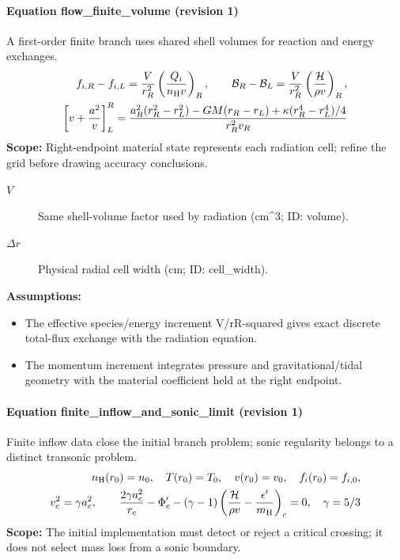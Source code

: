 \paragraph{Equation flow\_finite\_volume (revision 1)}
A first-order finite branch uses shared shell volumes for reaction and energy exchanges.
\begin{equation}
\begin{aligned}
f_{i,R}-f_{i,L}=\frac{V}{r_R^2}\left(\frac{Q_i}{n_{\rm H}v}\right)_R,\qquad \mathcal B_R-\mathcal B_L=\frac{V}{r_R^2}\left(\frac{\mathcal H}{\rho v}\right)_R,\\\left[v+\frac{a^2}{v}\right]_L^R=\frac{a_R^2(r_R^2-r_L^2)-GM(r_R-r_L)+\kappa(r_R^4-r_L^4)/4}{r_R^2v_R}
\end{aligned}
\label{eq:escape.coupled_5f_hydrogen:flow_5f_finite_5f_volume:1}
\end{equation}
\noindent\textbf{Scope:} Right-endpoint material state represents each radiation cell; refine the grid before drawing accuracy conclusions.

\begin{description}
\item[$V$] Same shell-volume factor used by radiation (cm\textasciicircum{}3; ID: volume).
\item[$\Delta r$] Physical radial cell width (cm; ID: cell\_width).
\end{description}

\noindent\textbf{Assumptions:}
\begin{itemize}
\item The effective species/energy increment V/rR-squared gives exact discrete total-flux exchange with the radiation equation.
\item The momentum increment integrates pressure and gravitational/tidal geometry with the material coefficient held at the right endpoint.
\end{itemize}

\paragraph{Equation finite\_inflow\_and\_sonic\_limit (revision 1)}
Finite inflow data close the initial branch problem; sonic regularity belongs to a distinct transonic problem.
\begin{equation}
\begin{aligned}
n_{\rm H}(r_0)=n_0,\quad T(r_0)=T_0,\quad v(r_0)=v_0,\quad f_i(r_0)=f_{i,0},\\v_c^2=\gamma a_c^2,\qquad \frac{2\gamma a_c^2}{r_c}-\Phi_c^\prime-(\gamma-1)\left(\frac{\mathcal H}{\rho v}-\frac{\epsilon^\prime}{m_{\rm H}}\right)_c=0,\quad\gamma=5/3
\end{aligned}
\label{eq:escape.coupled_5f_hydrogen:finite_5f_inflow_5f_and_5f_sonic_5f_limit:1}
\end{equation}
\noindent\textbf{Scope:} The initial implementation must detect or reject a critical crossing; it does not select mass loss from a sonic boundary.

